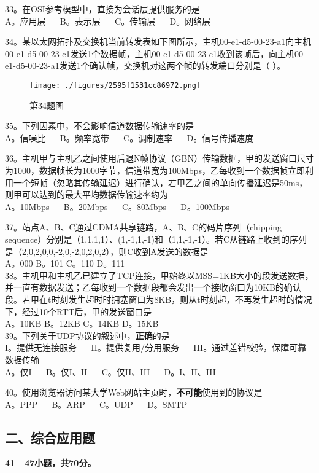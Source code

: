 33。在OSI参考模型中，直接为会话层提供服务的是 \\
A。应用层 $\quad$ B。表示层  $\quad$ C。传输层 $\quad$ D。网络层

34。某以太网拓扑及交换机当前转发表如下图所示，主机00-e1-d5-00-23-a1向主机00-e1-d5-00-23-c1发送1个数据帧，主机00-e1-d5-00-23-c1收到该帧后，向主机00-e1-d5-00-23-a1发送1个确认帧，交换机对这两个帧的转发端口分别是（ ）。
\begin{figure}[ht]
\centering
\texttt{[image: ./figures/2595f1531cc86972.png]}
\caption{第34题图} \label{fig_CSN14_3}
\end{figure}

35。下列因素中，不会影响信道数据传输速率的是 \\
A。信噪比 $\quad$ B。频率宽带 $\quad$ C。调制速率 $\quad$ D。信号传播速度

36。主机甲与主机乙之间使用后退N帧协议（GBN）传输数据，甲的发送窗口尺寸为1000，数据帧长为1000字节，信道带宽为100Mbps，乙每收到一个数据帧立即利用一个短帧（忽略其传输延迟）进行确认，若甲乙之间的单向传播延迟是50ms，则甲可以达到的最大平均数据传输速率约为 \\
A。10Mbps $\quad$ B。20Mbps $\quad$ C。80Mbps $\quad$ D。100Mbps

37。站点A、B、C通过CDMA共享链路，A、B、C的码片序列（chipping sequence）分别是（1,1,1,1）、(1,-1,1,-1)和（1,1,-1,-1）。若C从链路上收到的序列是（2,0,2,0,0,-2,0,-2,0,2,0,2），则C收到A发送的数据是 \\
A。000 B。101 C。110 D。111 \\

38。主机甲和主机乙已建立了TCP连接，甲始终以MSS=1KB大小的段发送数据，并一直有数据发送；乙每收到一个数据段都会发出一个接收窗口为10KB的确认段。若甲在t时刻发生超时时拥塞窗口为8KB，则从t时刻起，不再发生超时的情况下，经过10个RTT后，甲的发送窗口是 \\
A。10KB B。12KB C。14KB D。15KB \\

39。下列关于UDP协议的叙述中，\textbf{正确}的是 \\
I。提供无连接服务 $\quad$ II。提供复用/分用服务 $\quad$ III。通过差错校验，保障可靠数据传输 \\
A。仅I $\quad$ B。仅I、II $\quad$ C。仅II、III $\quad$ D。I、II、III

40。使用浏览器访问某大学Web网站主页时，\textbf{不可能}使用到的协议是 \\
A。PPP $\quad$ B。ARP $\quad$ C。UDP $\quad$ D。SMTP

\subsection{二、综合应用题}
\textbf{41—47小题，共70分。}

